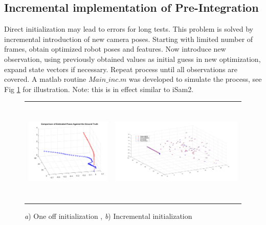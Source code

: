 \documentclass[12pt]{article}   %
\begin{document}
\subsection{Incremental implementation of Pre-Integration}
Direct initialization may lead to errors for long tests. This problem is solved by incremental introduction of new camera poses. Starting with limited number of frames, obtain optimized robot poses and features. Now introduce new observation, using previously obtained values as initial guess in new optimization, expand state vectors if necessary. Repeat process until all observations are covered. A matlab routine $Main\_inc.m$ was developed to simulate the process, see Fig \ref{fig:VIN sensor information} for illustration. Note: this is in effect similar to iSam2.

	\begin{figure}[h!]
		\begin{center}\begin{tabular}{cc}
				\includegraphics[height=5cm]{figures/simuNpose_error.png} &
				\includegraphics[height=5cm]{Figures/Final_pose-feature_3D_GT-vs-SLAM.jpg}\\				
			\end{tabular}\end{center}
			\caption{\emph{a}) One off initialization , \emph{b}) Incremental initialization } 
			\label{fig:VIN sensor information}
	\end{figure} 
\end{document}
